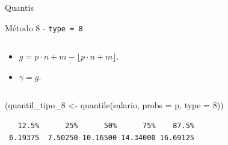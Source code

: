 \documentclass[
  10pt,
  ignorenonframetext,
]{beamer}
\newenvironment{Shaded}{\begin{snugshade}}{\end{snugshade}}
\newcommand{\AttributeTok}[1]{\textcolor[rgb]{0.40,0.45,0.13}{#1}}
\newcommand{\DecValTok}[1]{\textcolor[rgb]{0.68,0.00,0.00}{#1}}
\newcommand{\FunctionTok}[1]{\textcolor[rgb]{0.28,0.35,0.67}{#1}}
\newcommand{\NormalTok}[1]{\textcolor[rgb]{0.00,0.23,0.31}{#1}}
\newcommand{\OtherTok}[1]{\textcolor[rgb]{0.00,0.23,0.31}{#1}}
\providecommand{\tightlist}{%
  \setlength{\itemsep}{0pt}\setlength{\parskip}{0pt}}\usepackage{longtable,booktabs,array}
\begin{document}
\begin{frame}[fragile]{Quantis}
\begin{block}{Método 8 - \texttt{type\ =\ 8}}
\begin{columns}[T]
\begin{column}{0.5\textwidth}
\begin{itemize}
\tightlist
\item
  \(g = p\cdot n +m - \lfloor p\cdot n +m \rfloor\).
\item
  \(\gamma = g\).
\end{itemize}
\end{column}
\end{columns}

\begin{Shaded}
\begin{Highlighting}[]
\NormalTok{(quantil\_tipo\_8 }\OtherTok{\textless{}{-}} \FunctionTok{quantile}\NormalTok{(salario, }\AttributeTok{probs =}\NormalTok{ p, }\AttributeTok{type =} \DecValTok{8}\NormalTok{))}
\end{Highlighting}
\end{Shaded}

\begin{verbatim}
   12.5%      25%      50%      75%    87.5% 
 6.19375  7.50250 10.16500 14.34000 16.69125 
\end{verbatim}
\end{block}
\end{frame}
\end{document}
